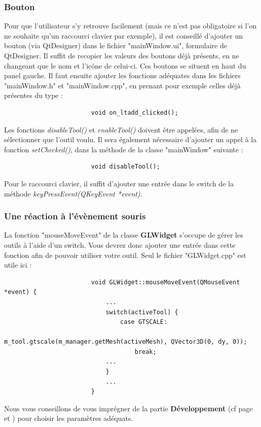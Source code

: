 \documentclass[a4paper]{memoir}
\begin{document}
				\subsubsection{Bouton}
					Pour que l'utilisateur s'y retrouve facilement (mais ce n'est pas obligatoire si l'on ne souhaite qu'un raccourci clavier par exemple), 
					il est conseillé d'ajouter un bouton (via QtDesigner) dans le fichier "mainWindow.ui", formulaire de QtDesigner. Il suffit de recopier 
					les valeurs des boutons déjà présents, en ne changeant que le nom et l'icône de celui-ci. Ces boutons se situent en haut du panel gauche.
					Il faut ensuite ajouter les fonctions adéquates dans les fichiers "mainWindow.h" et "mainWindow.cpp", en prenant pour exemple celles 
					déjà présentes du type :
					\begin{verbatim}
						void on_ltadd_clicked();
					\end{verbatim}
					Les fonctions \textit{disableTool()} et \textit{enableTool()} doivent être appelées, afin de ne sélectionner que l'outil voulu. Il sera 
					également nécessaire d'ajouter un appel à la fonction \textit{setChecked()}, dans la méthode de la classe "mainWindow" suivante :
					\begin{verbatim}
						void disableTool();
					\end{verbatim}
					Pour le raccourci clavier, il suffit d'ajouter une entrée dans le switch de la méthode \textit{keyPressEvent(QKeyEvent *event)}.
					
				\subsubsection{Une réaction à l'évènement souris}
					La fonction "mouseMoveEvent" de la classe \textbf{GLWidget} s'occupe de gérer les outils à l'aide d'un switch. Vous devrez donc ajouter 
					une entrée dans cette fonction afin de pouvoir utiliser votre outil. Seul le fichier "GLWidget.cpp" est utile ici :
					\begin{verbatim}
						void GLWidget::mouseMoveEvent(QMouseEvent *event) {
						    ...
						    switch(activeTool) {
						        case GTSCALE:
						            m_tool.gtscale(m_manager.getMesh(activeMesh), QVector3D(0, dy, 0));
						            break;
						    ...
						    }
						    ...
						}
					\end{verbatim}
					Nous vous conseillons de vous imprégner de la partie \textbf{Développement} (cf page \pageref{tool-dev} et \pageref{glwidget-dev}) pour 
					choisir les paramètres adéquats.
				
\end{document}
